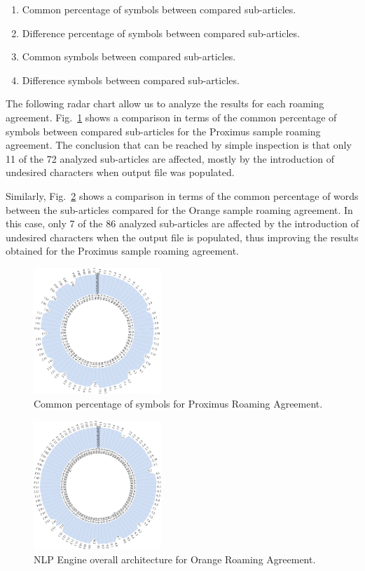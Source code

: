 \documentclass[conference]{style/IEEEtran}
\begin{document}
\begin{enumerate}
\item Common percentage of symbols between compared sub-articles.
\item Difference percentage of symbols between compared sub-articles.
\item Common symbols between compared sub-articles.
\item Difference symbols between compared sub-articles.
\end{enumerate}

The following radar chart allow us to analyze the results for each roaming agreement. Fig.~\ref{fig3} shows a comparison in terms of the common percentage of symbols between compared sub-articles for the Proximus sample roaming agreement. The conclusion that can be reached by simple inspection is that only 11 of the 72 analyzed sub-articles are affected, mostly by the introduction of undesired characters when output file was populated.

Similarly, Fig.~\ref{fig4} shows a comparison in terms of the common percentage of words between the sub-articles compared for the Orange sample roaming agreement. In this case, only 7 of the 86 analyzed sub-articles are affected by the introduction of undesired characters when the output file is populated, thus improving the results obtained for the Proximus sample roaming agreement.

\begin{figure}[htbp]
\centerline{\includegraphics[width=0.43\textwidth]{images/Proximus.png}}
\caption{Common percentage of symbols for Proximus Roaming Agreement.}
\label{fig3}
\end{figure}

\begin{figure}[htbp]
\centerline{\includegraphics[width=0.43\textwidth]{images/Orange.png}}
\caption{NLP Engine overall architecture for Orange Roaming Agreement.}
\label{fig4}
\end{figure}
\end{document}
